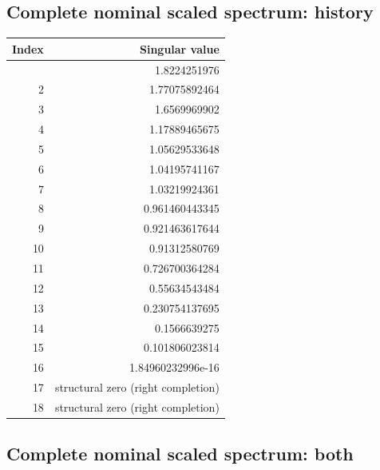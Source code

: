 \hypertarget{complete-nominal-scaled-spectrum-history}{%
\subsection{Complete nominal scaled spectrum: history}\label{complete-nominal-scaled-spectrum-history}}

\begin{longtable}[]{@{}rr@{}}
\toprule\noalign{}
Index & Singular value \\
\midrule\noalign{}
\endhead
\bottomrule\noalign{}
\endlastfoot
1 & 1.8224251976 \\
2 & 1.77075892464 \\
3 & 1.6569969902 \\
4 & 1.17889465675 \\
5 & 1.05629533648 \\
6 & 1.04195741167 \\
7 & 1.03219924361 \\
8 & 0.961460443345 \\
9 & 0.921463617644 \\
10 & 0.91312580769 \\
11 & 0.726700364284 \\
12 & 0.55634543484 \\
13 & 0.230754137695 \\
14 & 0.1566639275 \\
15 & 0.101806023814 \\
16 & 1.84960232996e-16 \\
17 & structural zero (right completion) \\
18 & structural zero (right completion) \\
\end{longtable}

\hypertarget{complete-nominal-scaled-spectrum-both}{%
\subsection{Complete nominal scaled spectrum: both}\label{complete-nominal-scaled-spectrum-both}}

